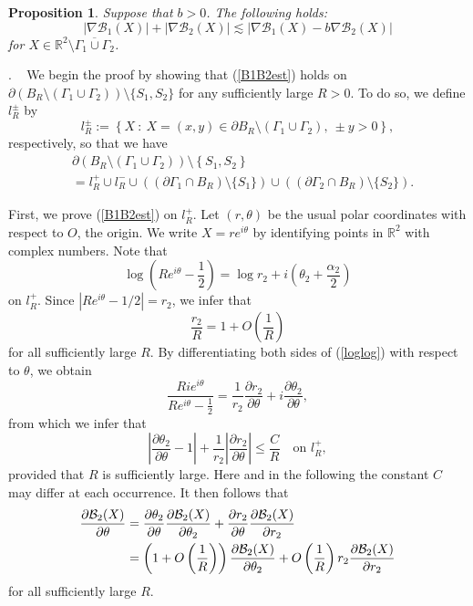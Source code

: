 \documentclass[11pt,a4paper]{article}
\numberwithin{equation}{section}
\newtheorem{prop}[thm]{Proposition}
\newcommand{\pf}{\noindent {\sl Proof}. \ }
\newcommand{\p}{\partial}
\newcommand{\eqnref}[1]{(\ref {#1})}
\newcommand{\Rbb}{\mathbb{R}}
\newcommand{\Bcal}{\mathcal{B}}
\newcommand{\Ga}{\alpha}
\newcommand{\Gt}{\theta}
\newcommand{\GG}{\Gamma}
\newcommand{\beq}{\begin{equation}}
\newcommand{\eeq}{\end{equation}}
\begin{document}
\begin{prop}\label{A} Suppose that $b>0$. The following holds:
\beq\label{B1B2est}
\left|\nabla \Bcal_1 (X) \right| + \left| \nabla \Bcal_2 (X) \right| \lesssim \left|\nabla \Bcal_1 (X) - b \nabla \Bcal_2 (X) \right|
\eeq
for  $X \in \Rbb^2  \setminus \overline{\GG_1 \cup \GG_2}$.
\end{prop}
\pf
We begin the proof by showing that \eqnref{B1B2est} holds on $\p \left( B_R \setminus (\GG_1 \cup \GG_2) \right) \setminus \{ S_1, S_2 \}$ for any sufficiently large $R >0$. To do so, we define $l_R^\pm$ by
$$
l_R^{\pm} := \left \{ X ~:~  X=(x,y) \in \p B_R \setminus (\GG _1 \cup \GG_2 ), \ \pm y > 0  \right \},
$$
respectively, so that we have
\begin{align*}
&\p \left( B_R \setminus (\GG _1 \cup \GG_2 ) \right) \setminus \left \{ S_1, S_2 \right\} \\
&= l_R^{+} \cup l_R^{-} \cup ( ( \p \GG_1 \cap B_R ) \setminus \{S_1 \}) \cup ( ( \p \GG_2 \cap B_R ) \setminus \{S_2 \}).
\end{align*}




First, we prove \eqnref{B1B2est} on $l_R^+$.  Let $(r, \Gt)$ be the usual polar coordinates with respect to $O$, the origin. We write $X = r e^{i\Gt}$ by identifying points in $\Rbb^2$ with complex numbers. Note that
\beq\label{loglog}
\log \left(R e^{i\Gt} - \frac 1 2 \right) = \log r_2 + i \left(\theta_2 + \frac {\Ga_2} 2 \right)
\eeq
on $l_R^+$. Since $|R e^{i\Gt} - 1/2| = r_2$, we infer that
\beq\label{r2/R}
\frac{r_2}{R} = 1 + O\left(\frac 1 R\right)
\eeq
for all sufficiently large $R$. By differentiating both sides of \eqnref{loglog} with respect to $\Gt$, we obtain
$$
\frac{Rie^{i\Gt}}{Re^{i\Gt}-\frac{1}{2}} = \frac{1}{r_2} \frac{\p r_2}{\p\Gt} + i \frac{\p \Gt_2}{\p\Gt},
$$
from which we infer that
$$
\left| \frac {\p \Gt_2} {\p \Gt}  - 1  \right| + \frac 1 {r_2}\left| \frac {\p r_2} {\p \Gt} \right| \leq \frac C R \quad \mbox{on } l_R^+,
$$
provided that $R$ is sufficiently large. Here and in the following the constant $C$ may differ at each occurrence. It then follows that
\begin{align}
\frac {\p \Bcal_2 (X)} {\p \Gt} &= \frac {\p \Gt_2} {\p \Gt} \frac {\p \Bcal_2 (X) } {\p \Gt_2}  + \frac {\p r_2} {\p \Gt} \frac {\p \Bcal_2 (X)} {\p r_2} \notag\\&= \left(1+ O\left(\frac 1 R\right)\right) \frac {\p \Bcal_2 (X) } {\p \Gt_2} + O\left(\frac 1 R\right) r_2 \frac {\p \Bcal_2 (X)} {\p r_2} \label{deri_B_2}
\end{align}
for all sufficiently large $R$.
\end{document}

